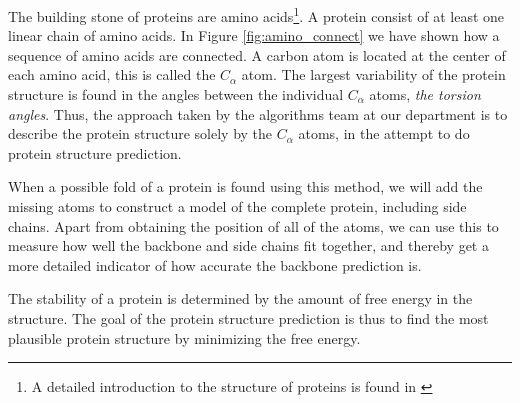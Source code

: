 \documentclass[10pt,a4paper,final,oneside,openany,article]{memoir}
\begin{document}
\begin{figure}
  \centering
\end{figure}


The building stone of proteins are amino acids\footnote{A detailed
  introduction to the structure of proteins is found in
  \cite{branden}}. A protein consist of at least one linear chain of
amino acids. In Figure \ref{fig:amino_connect} we have shown how a
sequence of amino acids are connected. A carbon atom is located at the
center of each amino acid, this is called the $C_\alpha$ atom. The
largest variability of the protein structure is found in the angles
between the individual $C_\alpha$ atoms\cite{lotan04}, \textit{the torsion
angles}. Thus, the approach taken by the algorithms team at our
department is to describe the protein structure solely by the
$C_\alpha$ atoms, in the attempt to do protein structure prediction.

When a possible fold of a protein is found using this method, we will
add the missing atoms to construct a model of the complete protein,
including side chains. Apart from obtaining the position of all of the
atoms, we can use this to measure how well the backbone and side
chains fit together, and thereby get a more detailed indicator of how
accurate the backbone prediction is.


The stability of a protein is determined by the amount of free energy
in the structure. The goal of the protein structure prediction is thus
to find the most plausible protein structure by minimizing the free
energy. 
\end{document}
